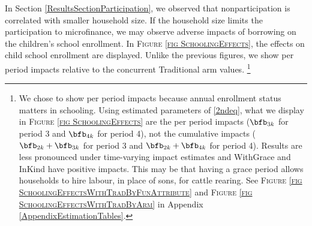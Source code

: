 \begin{figure}
\hfil{}
\end{figure}

	In Section \ref{ResultsSectionParticipation}, we observed that nonparticipation is correlated with smaller household size. If the household size limits the participation to microfinance, we may observe adverse impacts of borrowing on the children's school enrollment. In \textsc{\footnotesize Figure \ref{fig SchoolingEffects}}, the effects on child school enrollment are displayed. Unlike the previous figures, we show per period impacts relative to the concurrent \textsf{Traditional} arm values. \footnote{We chose to show per period impacts because annual enrollment status matters in schooling. Using estimated parameters of \eqref{2ndeq}, what we display in \textsc{\footnotesize Figure \ref{fig SchoolingEffects}} are the per period impacts ($\bfb_{3k}$ for period 3 and $\bfb_{4k}$ for period 4), not the cumulative impacts ($\bfb_{2k}+\bfb_{3k}$ for period 3 and $\bfb_{2k}+\bfb_{4k}$ for period 4). Results are less pronounced under time-varying impact estimates and \textsf{WithGrace} and \textsf{InKind} have positive impacts. This may be that having a grace period allows households to hire labour, in place of sons, for cattle rearing. See \textsc{Figure \ref{fig SchoolingEffectsWithTradByFunAttribute}} and \textsc{Figure \ref{fig SchoolingEffectsWithTradByArm}} in Appendix \ref{AppendixEstimationTables}. } 



